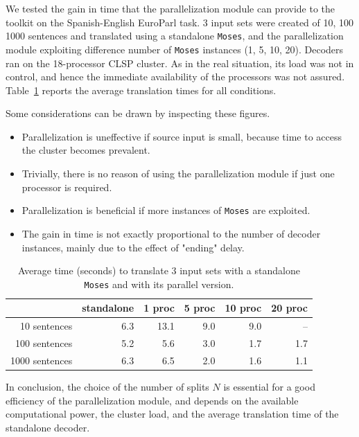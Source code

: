 \documentclass[11pt]{report}
\theoremstyle{plain}
\begin{document}
{We tested the gain in time that  the parallelization module can provide to the toolkit on the Spanish-English EuroParl task. 3 input sets were created of 10, 100 1000 sentences and translated using a standalone  {\tt Moses}, and the parallelization module exploiting difference number of {\tt Moses} instances (1, 5, 10, 20).
Decoders ran on the 18-processor CLSP cluster. As in the real situation, its load was not in control, and hence the immediate availability of the processors was not assured. Table~\ref{tbl:parallel-time} reports the average translation times for all conditions.

Some considerations can be drawn by inspecting these figures.
\begin{itemize}
\item Parallelization is uneffective if source input is small, because time to access the cluster becomes prevalent.
\item Trivially, there is no reason of using the parallelization module if just one processor is required. 
\item Parallelization is beneficial if more instances of {\tt Moses} are exploited.
\item The gain in time is not exactly proportional to the number of decoder instances, mainly due to the effect  of "ending" delay.
\end{itemize}


\begin{table}
\label{tbl:parallel-time}
\begin{center}
\begin{tabular}{r|rrrrr}
                 & standalone   &1 proc  & 5 proc  &  10 proc   &  20 proc\\
                 \hline
     10 sentences   &  6.3  &  13.1 &  9.0  &  9.0   &     --  \\
  100 sentences   &  5.2  &  5.6    &  3.0  &  1.7   &   1.7 \\
1000 sentences   & 6.3   &  6.5    &  2.0  &  1.6   &   1.1 \\
\end{tabular}
\caption{Average time (seconds) to translate 3 input sets with a standalone {\tt Moses} and with its parallel version.}
\end{center}
\end{table}

In conclusion, the choice of the number of splits $N$ is essential for a good efficiency of the parallelization module, and depends on the available computational power, the cluster load, and the average translation time of the standalone decoder.



}
\end{document}
